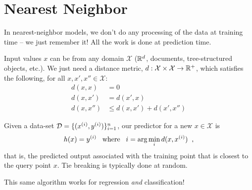 \section{Nearest Neighbor}
\label{sec-np_nn}

In nearest-neighbor models, we don't do any processing of the data at
training time -- we just remember it!  All the work is done at
prediction time.

Input values $x$ can be from any domain $\mathcal X$ ($\mathbb{R}^d$, documents,
tree-structured objects, etc.).
We just need a distance metric, $d: \mathcal X \times \mathcal X
  \rightarrow \mathbb{R}^+$, which satisfies the following, for all $x, x', x'' \in
  \mathcal X$:
\begin{align*}
  d(x, x)   & = 0                        \\
  d(x, x')  & = d(x', x)                 \\
  d(x, x'') & \leq d(x, x') + d(x', x'')
\end{align*}

Given a data-set ${\cal D} = \{(x^{(i)},y^{(i)})\}_{i=1}^n$, our
predictor for a new $x \in \mathcal X$ is
\begin{equation}
  h(x) = y^{(i)} \;\;\;\text{where}\;\;\;i = {\rm arg}\min_{i} d(x,
  x^{(i)})\;\;,
\end{equation}
that is, the predicted output associated with the training point that
is closest to the query point $x$. Tie breaking is typically done at random.

This same algorithm works for regression {\em and} classification!

